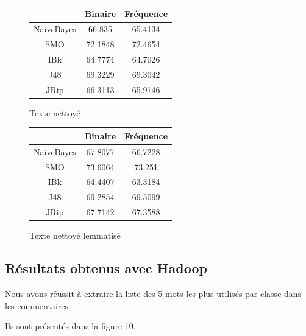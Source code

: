 \documentclass[a4paper, 11pt]{article}
\begin{document}
\begin{figure}[h]
\begin{minipage}{0.5\textwidth}
\begin{tabular}{|c|c|c|}
\hline
 & Binaire & Fréquence \\
 \hline
 NaiveBayes & 66.835 & 65.4134 \\
 \hline
 SMO & 72.1848 & 72.4654 \\
 \hline
 IBk & 64.7774 & 64.7026 \\
 \hline
 J48 & 69.3229 & 69.3042 \\
 \hline
 JRip & 66.3113 & 65.9746 \\
 \hline
\end{tabular}
\caption{Texte nettoyé}
\end{minipage}
\begin{minipage}{0.5\textwidth}
\begin{tabular}{|c|c|c|}
\hline
 & Binaire & Fréquence \\
 \hline
 NaiveBayes & 67.8077 & 66.7228 \\
 \hline
 SMO & 73.6064 & 73.251 \\
 \hline
 IBk & 64.4407 & 63.3184 \\
 \hline
 J48 & 69.2854 & 69.5099 \\
 \hline
 JRip & 67.7142 & 67.3588 \\
 \hline
\end{tabular}
\caption{Texte nettoyé lemmatisé}
\end{minipage}
\end{figure}

\subsection{Résultats obtenus avec Hadoop}
Nous avons réussit à extraire la liste des 5 mots les plus utilisés par classe dans les commentaires.

Ils sont présentés dans la figure 10.
\end{document}
